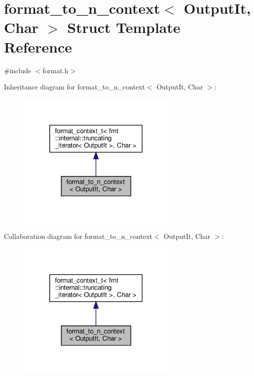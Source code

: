 \hypertarget{structformat__to__n__context}{}\section{format\+\_\+to\+\_\+n\+\_\+context$<$ Output\+It, Char $>$ Struct Template Reference}
\label{structformat__to__n__context}


{\ttfamily \#include $<$format.\+h$>$}



Inheritance diagram for format\+\_\+to\+\_\+n\+\_\+context$<$ Output\+It, Char $>$\+:
\nopagebreak
\begin{figure}[H]
\begin{center}
\leavevmode
\includegraphics[width=221pt]{structformat__to__n__context__inherit__graph}
\end{center}
\end{figure}


Collaboration diagram for format\+\_\+to\+\_\+n\+\_\+context$<$ Output\+It, Char $>$\+:
\nopagebreak
\begin{figure}[H]
\begin{center}
\leavevmode
\includegraphics[width=221pt]{structformat__to__n__context__coll__graph}
\end{center}
\end{figure}
